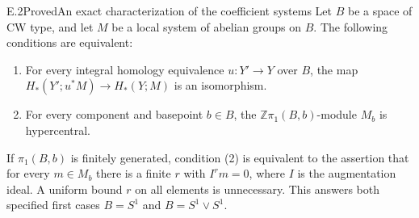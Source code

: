 \begin{claim}{E.2}{Proved}{An exact characterization of the coefficient systems}
Let $B$ be a space of CW type, and let $M$ be a local system of abelian
groups on $B$. The following conditions are equivalent:
\begin{enumerate}
\item For every integral homology equivalence $u:Y'\to Y$ over $B$,
the map $H_*(Y';u^*M)\to H_*(Y;M)$ is an isomorphism.
\item For every component and basepoint $b\in B$, the
$\mathbb Z\pi_1(B,b)$-module $M_b$ is hypercentral.
\end{enumerate}
If $\pi_1(B,b)$ is finitely generated, condition (2) is equivalent to
the assertion that for every $m\in M_b$ there is a finite $r$ with
$I^rm=0$, where $I$ is the augmentation ideal. A uniform bound $r$
on all elements is unnecessary. This answers both specified first
cases $B=S^1$ and $B=S^1\vee S^1$.
\end{claim}
